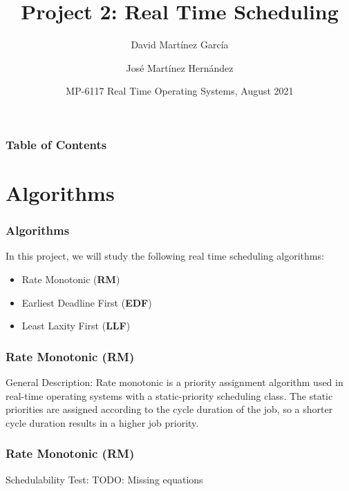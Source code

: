 \documentclass[xcolor=table]{beamer}
\title[Real Time Scheduling] %
{Project 2: Real Time Scheduling}
\author[ David Martínez, José Martínez] %
{David Martínez García\inst{1} \and José Martínez Hernández\inst{2}}
\institute[TEC] %
{
  \inst{1}%
  \url{david.martinez@estudiantec.cr}\\
  \textsc{2007058596}
  \and
  \inst{2}%
  \url{jpmh.1309@estudiantec.cr} \\
  \textsc{2020426476}
}
\date[August 2021] %
{MP-6117 Real Time Operating Systems, August 2021}
\begin{document}
\frame{\titlepage}


\begin{frame}
\frametitle{Table of Contents}
\tableofcontents
\end{frame}


\section{Algorithms}

\begin{frame}
\frametitle{Algorithms}
In this project, we will study the following real time scheduling algorithms:

\begin{itemize}
    \item Rate Monotonic (\textbf{RM})
    \item Earliest Deadline First (\textbf{EDF})
    \item Least Laxity First (\textbf{LLF})
\end{itemize}
\end{frame}


\begin{frame}
\frametitle{Rate Monotonic (\textbf{RM})}

\begin{alertblock}{General Description:}
Rate monotonic is a priority assignment algorithm used in real-time operating systems with a static-priority scheduling class. The static priorities are assigned according to the cycle duration of the job, so a shorter cycle duration results in a higher job priority.
\end{alertblock}

\end{frame}

\begin{frame}
\frametitle{Rate Monotonic (\textbf{RM})}

\begin{block}{Schedulability Test:}
TODO: Missing equations
\end{block}

\end{frame}
\end{document}
